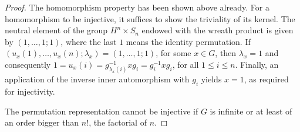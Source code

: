 \documentclass{amsart}
\theoremstyle{definition}
\numberwithin{equation}{section}
\begin{document}
\begin{proof}
The homomorphism property has been shown above already.
For a homomorphism to be injective, it suffices to show the triviality of its kernel.
The neutral element of the group \(H^n\times S_n\) endowed with the wreath product
is given by \((1,\ldots,1;1)\), where the last \(1\) means the identity permutation.
If \((u_x(1),\ldots,u_x(n);\lambda_x)=(1,\ldots,1;1)\), for some \(x\in G\),
then \(\lambda_x=1\) and consequently \(1=u_x(i)=g_{\lambda_x(i)}^{-1}xg_i=g_i^{-1}xg_i\),
for all \(1\le i\le n\).
Finally, an application of the inverse inner automorphism with \(g_i\) yields \(x=1\), as required for injectivity.

The permutation representation
cannot be injective if \(G\) is infinite or at least of an order bigger than \(n!\),
the factorial of \(n\).
\end{proof}
\end{document}
